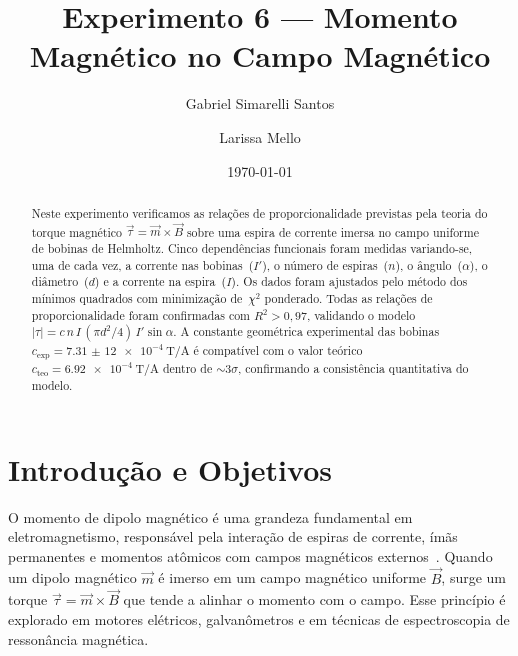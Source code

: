 \documentclass[aps, twocolumn, superscriptaddress, floatfix, nofootinbib]{revtex4-2}
\begin{document}
\title{Experimento 6 --- Momento Magnético no Campo Magnético}

\author{Gabriel Simarelli Santos}
\author{Larissa Mello}


\date{\today}

\begin{abstract}
Neste experimento verificamos as relações de proporcionalidade previstas pela
teoria do torque magnético $\vec{\tau} = \vec{m}\times\vec{B}$ sobre uma espira
de corrente imersa no campo uniforme de bobinas de Helmholtz. Cinco
dependências funcionais foram medidas variando-se, uma de cada vez, a corrente
nas bobinas~($I'$), o número de espiras~($n$), o ângulo~($\alpha$), o
diâmetro~($d$) e a corrente na espira~($I$). Os dados foram ajustados pelo
método dos mínimos quadrados com minimização de~$\chi^2$ ponderado. Todas as
relações de proporcionalidade foram confirmadas com $R^2>0{,}97$, validando o
modelo $|\tau| = c\,n\,I\,(\pi d^2/4)\,I'\sin\alpha$. A constante geométrica
experimental das bobinas $c_{\text{exp}} = \SI{7,31(12)e-4}{\tesla\per\ampere}$
é compatível com o valor teórico $c_{\text{teo}} =
\SI{6,92e-4}{\tesla\per\ampere}$ dentro de $\sim 3\sigma$, confirmando a
consistência quantitativa do modelo.
\end{abstract}

\maketitle

\section{Introdução e Objetivos}

O momento de dipolo magnético é uma grandeza fundamental em eletromagnetismo,
responsável pela interação de espiras de corrente, ímãs permanentes e momentos
atômicos com campos magnéticos externos~\cite{Griffiths2017}. Quando um dipolo
magnético $\vec{m}$ é imerso em um campo magnético uniforme $\vec{B}$, surge um
torque $\vec{\tau}=\vec{m}\times\vec{B}$ que tende a alinhar o momento com o
campo. Esse princípio é explorado em motores elétricos, galvanômetros e em
técnicas de espectroscopia de ressonância magnética.
\end{document}
